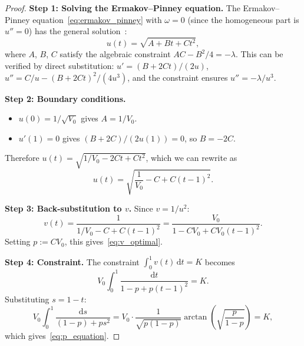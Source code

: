 \documentclass[11pt]{article}
\theoremstyle{definition}
\newcommand{\dd}{\mathrm{d}}
\begin{document}
\begin{proof}
\textbf{Step 1: Solving the Ermakov--Pinney equation.}
The Ermakov--Pinney equation~\eqref{eq:ermakov_pinney} with $\omega = 0$ (since the homogeneous part is $u'' = 0$) has the general solution~\cite{Pinney1950}:
\begin{equation}
  u(t) = \sqrt{A + Bt + Ct^2},
\end{equation}
where $A$, $B$, $C$ satisfy the algebraic constraint $AC - B^2/4 = -\lambda$. This can be verified by direct substitution: $u' = (B + 2Ct)/(2u)$, $u'' = C/u - (B+2Ct)^2/(4u^3)$, and the constraint ensures $u'' = -\lambda/u^3$.

\textbf{Step 2: Boundary conditions.}
\begin{itemize}
  \item $u(0) = 1/\sqrt{V_0}$ gives $A = 1/V_0$.
  \item $u'(1) = 0$ gives $(B + 2C)/(2u(1)) = 0$, so $B = -2C$.
\end{itemize}
Therefore $u(t) = \sqrt{1/V_0 - 2Ct + Ct^2}$, which we can rewrite as
\begin{equation}
  u(t) = \sqrt{\frac{1}{V_0} - C + C(t-1)^2}.
\end{equation}

\textbf{Step 3: Back-substitution to $v$.}
Since $v = 1/u^2$:
\begin{equation}
  v(t) = \frac{1}{1/V_0 - C + C(t-1)^2} = \frac{V_0}{1 - CV_0 + CV_0(t-1)^2}.
\end{equation}
Setting $p := CV_0$, this gives~\eqref{eq:v_optimal}.

\textbf{Step 4: Constraint.}
The constraint $\int_0^1 v(t)\,\dd t = K$ becomes
\begin{equation}
  V_0\int_0^1 \frac{\dd t}{1 - p + p(t-1)^2} = K.
\end{equation}
Substituting $s = 1-t$:
\begin{equation}
  V_0\int_0^1 \frac{\dd s}{(1-p) + ps^2} = V_0\cdot\frac{1}{\sqrt{p(1-p)}}\arctan\!\left(\sqrt{\frac{p}{1-p}}\right) = K,
\end{equation}
which gives~\eqref{eq:p_equation}.


\end{proof}
\end{document}
